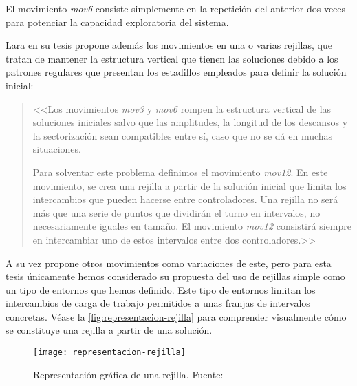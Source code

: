 El movimiento \textit{mov6} consiste simplemente en la repetición del anterior dos veces para potenciar la capacidad exploratoria del sistema.

Lara en su tesis propone además los movimientos en una o varias rejillas, que tratan de mantener la estructura vertical que tienen las soluciones debido a los patrones regulares que presentan los estadillos empleados para definir la solución inicial:

\begin{quotation} {\itshape
	
	<<Los movimientos \textit{mov3} y \textit{mov6} rompen la estructura vertical de las soluciones
	iniciales salvo que las amplitudes, la longitud de los descansos y la sectorización sean
	compatibles entre sí, caso que no se dá en muchas situaciones.
	
	Para solventar este problema definimos el movimiento \textit{mov12}. En este movimiento,
	se crea una rejilla a partir de la solución inicial que limita los intercambios
	que pueden hacerse entre controladores. Una rejilla no será más que una serie de
	puntos que dividirán el turno en intervalos, no necesariamente iguales en tamaño. El
	movimiento \textit{mov12} consistirá siempre en intercambiar uno de estos intervalos entre
	dos controladores.>>}
\end{quotation}

A su vez propone otros movimientos como variaciones de este, pero para esta tesis únicamente hemos considerado su propuesta del uso de rejillas simple como un tipo de entornos que hemos definido. Este tipo de entornos limitan los intercambios de carga de trabajo permitidos a unas franjas de intervalos concretas. Véase la \autoref{fig:representacion-rejilla} para comprender visualmente cómo se constituye una rejilla a partir de una solución.

\begin{figure}
	\centering
	\texttt{[image: representacion-rejilla]}
	\caption[Representación gráfica de una rejilla]{Representación gráfica de una rejilla. Fuente:~\cite{tesis-jonatan}}
	\label{fig:representacion-rejilla}
\end{figure}

